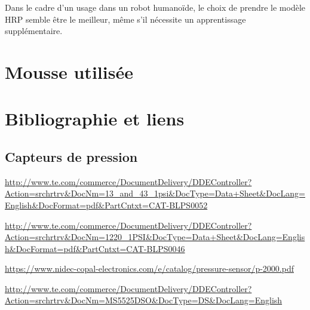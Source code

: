 \documentclass[11pt]{report}
\begin{document}
Dans le cadre d'un usage dans un robot humanoïde, le choix de prendre le modèle 
HRP semble être le meilleur, même s'il nécessite un apprentissage 
supplémentaire.


\section{Mousse utilisée}




\section{Bibliographie et liens}

\subsection{Capteurs de pression}


  \url{http://www.te.com/commerce/DocumentDelivery/DDEController?Action=srchrtrv&DocNm=13_and_43_1psi&DocType=Data+Sheet&DocLang=English&DocFormat=pdf&PartCntxt=CAT-BLPS0052}
  
  \url{http://www.te.com/commerce/DocumentDelivery/DDEController?Action=srchrtrv&DocNm=1220_1PSI&DocType=Data+Sheet&DocLang=English&DocFormat=pdf&PartCntxt=CAT-BLPS0046}
  
  \url{https://www.nidec-copal-electronics.com/e/catalog/pressure-sensor/p-2000.pdf}
  
  \url{http://www.te.com/commerce/DocumentDelivery/DDEController?Action=srchrtrv&DocNm=MS5525DSO&DocType=DS&DocLang=English}
  
\end{document}
